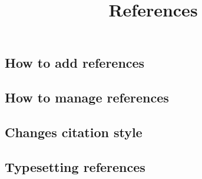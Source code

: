 \documentclass{article}
\begin{document}
\title{References}

\maketitle


\subsection{How to add references}\label{H2179089}






\subsection{How to manage references}\label{H7530259}






\subsection{Changes citation style}\label{H1331606}






\subsection{Typesetting references}\label{H6219918}
\end{document}
